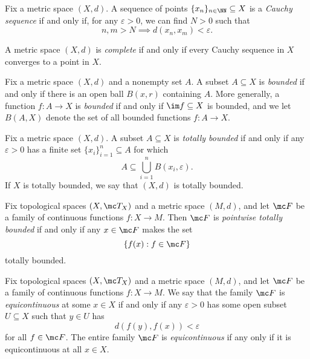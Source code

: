 \documentclass{article}
\begin{document}
\begin{definition}[Cauchy]
	Fix a metric space $(X,d)$. A sequence of points $\{x_n\}_{n\in\NN}\subseteq X$ is a \textit{Cauchy sequence} if and only if, for any $\varepsilon>0$, we can find $N>0$ such that
	\[n,m>N\implies d(x_n,x_m)<\varepsilon.\]
\end{definition}
\begin{definition}[Complete]
	A metric space $(X,d)$ is \textit{complete} if and only if every Cauchy sequence in $X$ converges to a point in $X$.
\end{definition}
\begin{definition}[Bounded]
	Fix a metric space $(X,d)$ and a nonempty set $A$. A subset $A\subseteq X$ is \textit{bounded} if and only if there is an open ball $B(x,r)$ containing $A$. More generally, a function $f\colon A\to X$ is \textit{bounded} if and only if $\im f\subseteq X$ is bounded, and we let $B(A,X)$ denote the set of all bounded functions $f\colon A\to X$.
\end{definition}
\begin{definition}
	Fix a metric space $(X,d)$. A subset $A\subseteq X$ is \textit{totally bounded} if and only if any $\varepsilon>0$ has a finite set $\{x_i\}_{i=1}^n\subseteq A$ for which
	\[A\subseteq\bigcup_{i=1}^nB(x_i,\varepsilon).\]
	If $X$ is totally bounded, we say that $(X,d)$ is totally bounded.
\end{definition}
\begin{definition}
	Fix topological spaces $(X,\mc T_X)$ and a metric space $(M,d)$, and let $\mc F$ be a family of continuous functions $f\colon X\to M$. Then $\mc F$ is \textit{pointwise totally bounded} if and only if any $x\in \mc F$ makes the set
	\[\{f(x):f\in\mc F\}\]
	totally bounded.
\end{definition}
\begin{definition}[Equicontinuous]
	Fix topological spaces $(X,\mc T_X)$ and a metric space $(M,d)$, and let $\mc F$ be a family of continuous functions $f\colon X\to M$. We say that the family $\mc F$ is \textit{equicontinuous} at some $x\in X$ if and only if any $\varepsilon>0$ has some open subset $U\subseteq X$ such that $y\in U$ has
	\[d(f(y),f(x))<\varepsilon\]
	for all $f\in \mc F$. The entire family $\mc F$ is \textit{equicontinuous} if any only if it is equicontinuous at all $x\in X$.
\end{definition}
\end{document}
